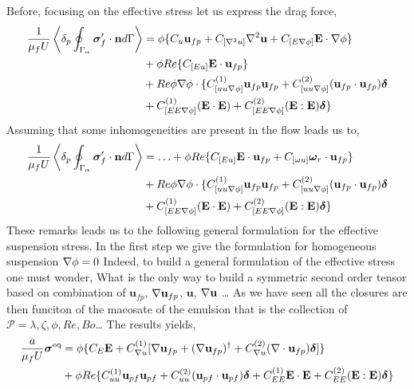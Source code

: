 Before, focusing on the effective stress let us express the drag force, 
\begin{align}
    \frac{1}{\mu_f U} \left<\delta_p \oint_{\Gamma_{\alpha}} \bm\sigma_f'\cdot \textbf{n} d\Gamma\right> &= 
    \phi \{C_u \textbf{u}_{fp}
    + C_{[\mathbf{\nabla}^2 u]} \mathbf{\nabla}^2 \textbf{u}
    +
    C_{[E \mathbf{\nabla}\phi ]} \textbf{E} \cdot \mathbf{\nabla} \phi 
    \} \\
    &+ \phi Re \{  C_{[E u]} \textbf{E} \cdot \textbf{u}_{fp} \}\\
    &+ Re \phi  \mathbf{\nabla}\phi \cdot \{ C_{[uu\mathbf{\nabla}\phi]}^{(1)} \textbf{u}_{fp}\textbf{u}_{fp}
    +  C_{[uu\mathbf{\nabla}\phi]}^{(2)} (\textbf{u}_{fp}\cdot \textbf{u}_{fp})\bm\delta \\
    &+ C_{[EE\mathbf{\nabla}\phi]}^{(1)} (\textbf{E} \cdot  \textbf{E}) 
    + C_{[EE\mathbf{\nabla}\phi]}^{(2)} (\textbf{E} : \textbf{E})\bm\delta \}
\end{align}
Assuming that some inhomogeneities are present in the flow leads us to, 
\begin{align}
    \frac{1}{\mu_f U} \left<\delta_p \oint_{\Gamma_{\alpha}} \bm\sigma_f'\cdot \textbf{n} d\Gamma\right> &= 
    \ldots
    + \phi Re \{  C_{[E u]} \textbf{E} \cdot \textbf{u}_{fp} 
    + C_{[\omega u]} \bm\omega_r \cdot \textbf{u}_{fp} \}\\
    &+ Re \phi  \mathbf{\nabla}\phi \cdot \{ C_{[uu\mathbf{\nabla}\phi]}^{(1)} \textbf{u}_{fp}\textbf{u}_{fp}
    +  C_{[uu\mathbf{\nabla}\phi]}^{(2)} (\textbf{u}_{fp}\cdot \textbf{u}_{fp})\bm\delta \\
    &+ C_{[EE\mathbf{\nabla}\phi]}^{(1)} (\textbf{E} \cdot  \textbf{E}) 
    + C_{[EE\mathbf{\nabla}\phi]}^{(2)} (\textbf{E} : \textbf{E})\bm\delta \}
\end{align}
These remarks leads us to the following general formulation for the effective suspension stress. 
In the first step we give the formulation for homogeneous suspension $\mathbf{\nabla} \phi = 0$ 
Indeed, to build a general formulation of the effective stress one must wonder, What is the only way to build a symmetric second order tensor based on combination of $\textbf{u}_{fp}$, $\mathbf{\nabla} \textbf{u}_{fp}$, $\textbf{u}$, $\mathbf{\nabla} \textbf{u}$ \ldots
As we have seen all the closures are then funciton of the macosate of the emulsion that is the collection of  $\mathcal{P} = \lambda,\zeta,\phi, Re, Bo$\ldots
The results yields, 
\begin{align}
    \frac{a}{\mu_f U}\bm\sigma^\text{eq} &= 
    \phi 
    \{ C_E  \textbf{E}
    +  C_{\mathbf{\nabla} u}^{(1)} [\mathbf{\nabla} \textbf{u}_{fp} +(\mathbf{\nabla} \textbf{u}_{fp})^\dagger + C_{\mathbf{\nabla} u}^{(2)}(\mathbf{\nabla}\cdot  \textbf{u}_{fp})\bm\delta] \}\\
    &+\phi Re \{ C_{uu}^{(1)}
        \textbf{u}_{pf}\textbf{u}_{pf} 
    + C_{uu}^{(2)} (\textbf{u}_{pf}\cdot \textbf{u}_{pf}) \bm\delta 
    +  C_{EE}^{(1)} \textbf{E}\cdot \textbf{E}
    +  C_{EE}^{(2)} (\textbf{E} : \textbf{E})\bm\delta \}
\end{align}
